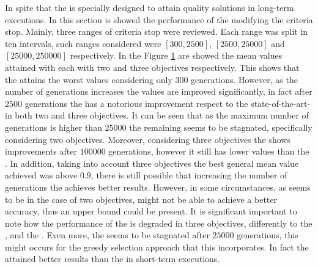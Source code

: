In spite that the \VSDMOEA{} is specially designed to attain quality solutions in long-term executions.
%
In this section is showed the performance of the \MOEAS{} modifying the criteria stop.
%
Mainly, three ranges of criteria stop were reviewed.
%
Each range was split in ten intervals, such ranges considered were $[300, 2500]$, $[2500, 25000]$ and $[25000, 250000]$ respectively.
%
In the Figure \ref{fig:Performance_time} are showed the mean \HV{} values attained with each \MOEA{} with two and three objectives respectively.
%
This shows that the \VSDMOEA{} attains the worst \HV{} values considering only $300$ generations.
%
However, as the number of generations increases the \HV{} values are improved significantly, in fact after $2500$ generations the \VSDMOEA{} has a notorious improvement respect to the state-of-the-art-\MOEAS{} in both two and three objectives.
%
It can be seen that as the maximum number of generations is higher than $25000$ the remaining \MOEAS{} seems to be stagnated, specifically considering two objectives.
%
Moreover, considering three objectives the \RMOEA{} shows improvements after $100000$ generations, however it still has lower values than the \VSDMOEA{}.
%
In addition, taking into account three objectives the best general mean value achieved was above $0.9$, there is still possible that increasing the number of generations the \VSDMOEA{} achieves better results.
%
However, in some circumstances, as seems to be in the case of two objectives, might not be able to achieve a better accuracy, thus an upper bound could be present.
%
It is significant important to note how the performance of the \NSGAII{} is degraded in three objectives, differently to the \RMOEA{}, and the \MOEAD{}.
%
Even more, the \MOEAD{} seems to be stagnated after $25000$ generations, this might occurs for the greedy selection approach that this \MOEA{} incorporates.
%
In fact the \MOEAD{} attained better results than the \RMOEA{} in short-term executions.
%

\begin{figure}[t]
\centering

\label{fig:Performance_time}
\end{figure}





%
%


%
%
